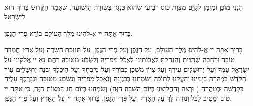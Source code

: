 \ \\

הִנְנִי מוּכָן וּמְזֻמָן לְקַיֵם מִצְוַת כּוֹס רְבִיעִי שֶׁהוּא כְּנֶגֶד בְּשׂוֹרַת הַיְשׁוּעָה, שֶׁאָמַר הַקָּדוֹשׁ בָּרוּךְ הוּא לְיִשְׂרָאֵל 

בָּרוּךְ אַתָּה יי אֱ-לֹהֵינוּ מֶלֶךְ הָעוֹלָם בּוֹרֵא פְּרִי הַגָּפֶן.



בָּרוּךְ אַתָּה יי אֱ-לֹהֵינוּ מֶלֶךְ הָעוֹלָם, עַל הַגֶּפֶן וְעַל פְּרִי הַגֶּפֶן, עַל תְּנוּבַת הַשָּׂדֶה וְעַל אֶרֶץ חֶמְדָּה טוֹבָה וּרְחָבָה שֶׁרָצִיתָ וְהִנְחַלְתָּ לַאֲבוֹתֵינוּ לֶאֱכֹל מִפִּרְיָהּ וְלִשְׂבֹּעַ מִטּוּבָהּ רַחֶם נָא יי אֱלֹקֵינוּ עַל יִשְׂרָאֵל עַמֶּךָ וְעַל יְרוּשָׁלַיִם עִירֶךָ וְעַל צִיּוֹן מִשְׁכַּן כְּבוֹדֶךָ וְעַל מִזְבְּחֶךָ וְעַל הֵיכָלֶךָ וּבְנֵה יְרוּשָׁלַיִם עִיר הַקֹדֶשׁ בִּמְהֵרָה בְיָמֵינוּ וְהַעֲלֵנוּ לְתוֹכָהּ וְשַׂמְחֵנוּ בְּבִנְיָנָהּ וְנֹאכַל מִפִּרְיָהּ וְנִשְׂבַּע מִטּוּבָהּ וּנְבָרֶכְךָ עָלֶיהָ בִּקְדֻשָׁה 
וּבְטָהֳרָה ( וּרְצֵה וְהַחֲלִיצֵנוּ בְּיוֹם הַשַׁבָּת הַזֶּה) וְשַׂמְחֵנוּ בְּיוֹם חַג הַמַּצּוֹת הַזֶּה, כִּי אַתָּה יי טוֹב וּמֵטִיב לַכֹּל וְנוֹדֶה לְּךָ עַל הָאָרֶץ וְעַל פְּרִי הַגָּפֶן. בָּרוּךְ אַתָּה יי עַל הָאָרֶץ וְעַל פְּרִי הַגָּפֶן.

\break


